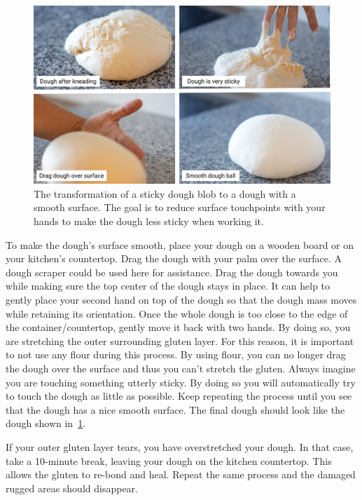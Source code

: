 \begin{figure}[!htb]
  \includegraphics[width=\textwidth]{dough-ball-steps}
  \caption[Creating a smooth surface]{The transformation of a sticky dough
      blob to a dough with a smooth surface. The goal is to reduce surface
      touchpoints with your hands to make the dough less sticky when working
      it.}%
  \label{fig:dough-ball-steps}
\end{figure}

To make the dough's surface smooth, place your dough on a wooden board or
on your kitchen's countertop. Drag the dough with your palm over the surface.
A dough scraper could be used here for assistance.
Drag the dough towards you while making sure the top center of the dough stays in place.
It can help to gently place your second hand on top of the dough so that
the dough mass moves while retaining its orientation. Once the whole dough
is too close to the edge of the container/countertop, gently move it back
with two hands. By doing so, you are stretching the outer surrounding gluten layer.
For this reason, it is important to not use any flour during this process.
By using flour, you can no longer drag the dough over the surface and thus
you can't stretch the gluten. Always imagine you are touching something utterly sticky.
By doing so you will automatically try to touch the dough as little
as possible. Keep repeating the process until you see that the dough
has a nice smooth surface. The final dough should look like the dough
shown in~\ref{fig:dough-ball-steps}.

If your outer gluten layer tears, you have overstretched your dough. In
that case, take a 10-minute break, leaving your dough on the kitchen countertop.
This allows the gluten to re-bond and heal. Repeat the same process
and the damaged rugged areas should disappear.

